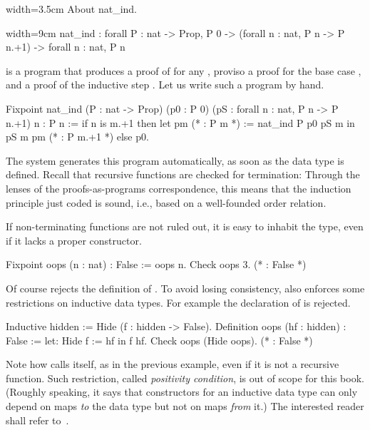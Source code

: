 \begin{coq}{}{width=3.5cm}
About nat_ind.
\end{coq}
\begin{coqout}{}{width=9cm}
nat_ind : forall P : nat -> Prop,
  P 0 -> (forall n : nat, P n -> P n.+1) -> forall n : nat, P n
\end{coqout}
 is a program that produces a proof of  for any ,
proviso a proof for the base case , and a proof
of the inductive step .
Let us write such a program by hand.

\begin{coq}{}{}
Fixpoint nat_ind (P : nat -> Prop)
  (p0 : P 0) (pS : forall n : nat, P n -> P n.+1) n : P n :=
  if n is m.+1 then
    let pm (* : P m *) := nat_ind P p0 pS m in
    pS m pm (* : P m.+1 *)
  else p0.
\end{coq}

The \Coq{} system generates this program automatically, as soon as
 the  data type
is defined.  Recall that recursive functions are checked for termination:
Through the lenses of the proofs-as-programs correspondence, this means
that the induction principle just coded is sound, i.e., based on a
well-founded order relation.

If non-terminating functions are not ruled out, it is easy to inhabit
the  type, even if it lacks a proper constructor.

\begin{coq}{}{}
Fixpoint oops (n : nat) : False := oops n.
Check oops 3.  (* : False *)
\end{coq}
Of course \Coq{} rejects the definition of .  To avoid
losing consistency, \Coq{} also enforces some restrictions on
inductive data types.  For example the declaration of 
is rejected.

\begin{coq}{}{}
Inductive hidden := Hide (f : hidden -> False).
Definition oops (hf : hidden) : False := let: Hide f := hf in f hf.
Check oops (Hide oops).  (* : False *)
\end{coq}
Note how  calls itself, as in the previous example,
even if it is not a recursive function.
Such restriction, called
\emph{positivity condition}, is out of scope for this book.
(Roughly speaking, it says that constructors for an inductive data
type can only depend on maps \emph{to} the data type but not on maps
\emph{from} it.)
The interested reader shall refer to~\cite{Coq:manual}.

